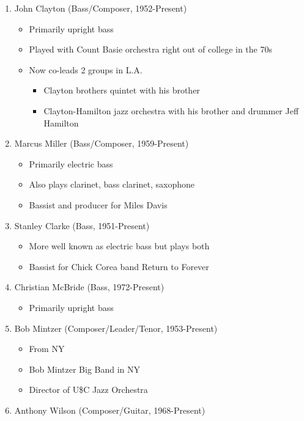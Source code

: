 \documentclass[]{article}
\providecommand{\tightlist}{%
  \setlength{\itemsep}{0pt}\setlength{\parskip}{0pt}}
\begin{document}
\begin{enumerate}
\def\labelenumi{\arabic{enumi}.}
\tightlist
\item
  John Clayton (Bass/Composer, 1952-Present)

  \begin{itemize}
  \tightlist
  \item
    Primarily upright bass
  \item
    Played with Count Basie orchestra right out of college in the 70s
  \item
    Now co-leads 2 groups in L.A.

    \begin{itemize}
    \tightlist
    \item
      Clayton brothers quintet with his brother
    \item
      Clayton-Hamilton jazz orchestra with his brother and drummer Jeff
      Hamilton
    \end{itemize}
  \end{itemize}
\item
  Marcus Miller (Bass/Composer, 1959-Present)

  \begin{itemize}
  \tightlist
  \item
    Primarily electric bass
  \item
    Also plays clarinet, bass clarinet, saxophone
  \item
    Bassist and producer for Miles Davis
  \end{itemize}
\item
  Stanley Clarke (Bass, 1951-Present)

  \begin{itemize}
  \tightlist
  \item
    More well known as electric bass but plays both
  \item
    Bassist for Chick Corea band Return to Forever
  \end{itemize}
\item
  Christian McBride (Bass, 1972-Present)

  \begin{itemize}
  \tightlist
  \item
    Primarily upright bass
  \end{itemize}
\item
  Bob Mintzer (Composer/Leader/Tenor, 1953-Present)

  \begin{itemize}
  \tightlist
  \item
    From NY
  \item
    Bob Mintzer Big Band in NY
  \item
    Director of U\$C Jazz Orchestra
  \end{itemize}
\item
  Anthony Wilson (Composer/Guitar, 1968-Present)


\end{enumerate}
\end{document}
